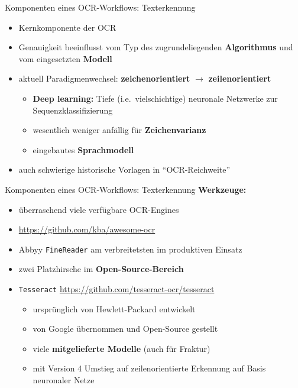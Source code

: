 \documentclass{bbawslides}
\begin{document}
\begin{bbawslide}{Komponenten eines OCR-Workflows: Texterkennung}
  \vspace*{7mm}%
  \centerslidestrue%
  \begin{itemize}
    \item Kernkomponente der OCR
    \item Genauigkeit beeinflusst vom Typ des zugrundeliegenden \textbf{Algorithmus} und vom eingesetzten \textbf{Modell}
    \item aktuell Paradigmenwechsel: \textbf{zeichenorientiert} $\rightarrow$ \textbf{zeilenorientiert}
    \begin{itemize} \small
      \item \textbf{Deep learning:} Tiefe (i.e.~vielschichtige) neuronale Netzwerke zur Sequenzklassifizierung 
      \item wesentlich weniger anfällig für \textbf{Zeichenvarianz}
      \item eingebautes \textbf{Sprachmodell}
    \end{itemize}
    \item auch schwierige historische Vorlagen in \enquote{OCR-Reichweite} 
  \end{itemize}
\end{bbawslide}

\begin{bbawslide}{Komponenten eines OCR-Workflows: Texterkennung}
  \vspace*{7mm}%
  \centerslidestrue%
  \textbf{Werkzeuge:}
  \begin{itemize}
    \item überraschend viele verfügbare OCR-Engines
    \item \url{https://github.com/kba/awesome-ocr}
    \item Abbyy \texttt{FineReader} am verbreitetsten im produktiven Einsatz
    \item zwei Platzhirsche im \textbf{Open-Source-Bereich}
    \item \texttt{Tesseract} \url{https://github.com/tesseract-ocr/tesseract}
    \begin{itemize}\small
      \item ursprünglich von Hewlett-Packard entwickelt
      \item von Google übernommen und Open-Source gestellt
      \item viele \textbf{mitgelieferte Modelle} (auch für Fraktur)
      \item mit Version 4 Umstieg auf zeilenorientierte Erkennung auf Basis neuronaler Netze
    \end{itemize}
  \end{itemize}
\end{bbawslide}
\end{document}
